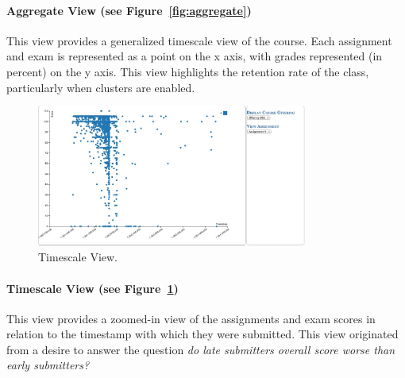 \paragraph{Aggregate View (see Figure~\ref{fig:aggregate}) }
This view provides a generalized timescale view of the course. Each assignment and exam is represented as a point on the x axis, with grades represented (in percent) on the y axis. This view highlights the retention rate of the class, particularly when clusters are enabled. 


\begin{figure}[htb]
 \centering
 \includegraphics[width=3.5in]{timescale.jpg}
 \caption{Timescale View.}
 \label{fig:timescale}	
\end{figure}

\paragraph{Timescale View (see Figure~\ref{fig:timescale}) }
This view provides a zoomed-in view of the assignments and exam scores in relation to the timestamp with which they were submitted. This view originated from a desire to answer the question \emph{do late submitters overall score worse than early submitters?}


%



